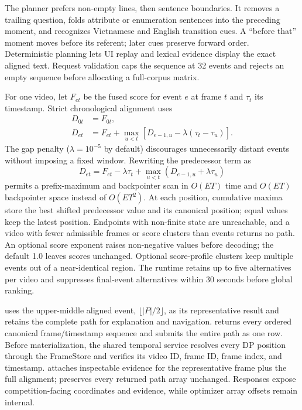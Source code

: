 The planner prefers non-empty lines, then sentence boundaries. It removes a
trailing question, folds attribute or enumeration sentences into the preceding
moment, and recognizes Vietnamese and English transition cues. A ``before that''
moment moves before its referent; later cues preserve forward order.
Deterministic planning lets UI replay and lexical evidence display the exact
aligned text. Request validation caps the sequence at 32 events and rejects an
empty sequence before allocating a full-corpus matrix.

For one video, let $F_{et}$ be the fused score for event $e$ at frame $t$ and
$\tau_t$ its timestamp. Strict chronological alignment uses
\begin{align}
 D_{0t}&=F_{0t},\nonumber\\
 D_{et}&=F_{et}+\max_{u<t}\left[D_{e-1,u}
              -\lambda(\tau_t-\tau_u)\right].
 \label{eq:dp}
\end{align}
The gap penalty ($\lambda=10^{-5}$ by default) discourages unnecessarily distant
events without imposing a fixed window. Rewriting the predecessor term as
\begin{equation}
 D_{et}=F_{et}-\lambda\tau_t+
 \max_{u<t}\left(D_{e-1,u}+\lambda\tau_u\right)
 \label{eq:prefix-dp}
\end{equation}
permits a prefix-maximum and backpointer scan in $O(ET)$ time and $O(ET)$
backpointer space instead of $O(ET^2)$. At each position, cumulative maxima store
the best shifted predecessor value and its canonical position; equal values keep
the latest position. Endpoints with non-finite state are unreachable, and a video
with fewer admissible frames or score clusters than events returns no path. An optional
score exponent raises non-negative values before decoding; the default 1.0
leaves scores unchanged. Optional score-profile clusters keep
multiple events out of a near-identical region. The runtime retains up to five
alternatives per video and suppresses final-event alternatives within 30 seconds
before global ranking.

\KIS{} uses the upper-middle aligned event, $\lfloor |P|/2\rfloor$, as its
representative result and retains the complete path for explanation and
navigation. \TRAKE{} returns every ordered canonical frame/timestamp sequence and
submits the entire path as one row. Before materialization, the shared temporal
service resolves every DP position through the FrameStore and verifies its video
ID, frame ID, frame index, and timestamp. \KIS{} attaches inspectable evidence for
the representative frame plus the full alignment; \TRAKE{} preserves every
returned path array unchanged. Responses expose competition-facing coordinates
and evidence, while optimizer array offsets remain internal.

